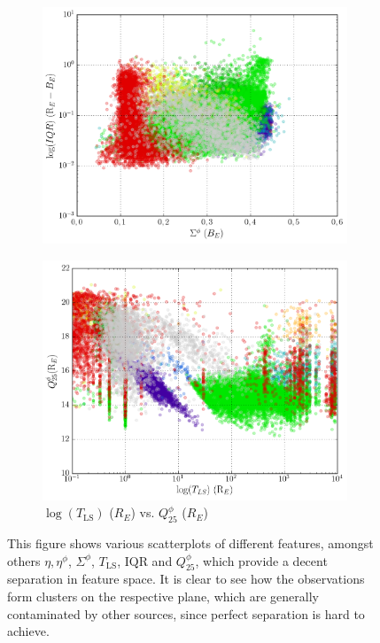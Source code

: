 \begin{figure}[H]
\begin{subfigure}[t]{0.49\textwidth}
		\label{fig:2e}
		\includegraphics[width=\textwidth]{figures/scatterplots/B-phase-cs-R-B-IQR.png}
	\end{subfigure}
	\begin{subfigure}[t]{0.49\textwidth}
		\centering
		\caption{$\log(T_{\text{LS}})$ ($R_E$) vs. $Q_{25}^\phi$ ($R_E$)}
		\label{fig:2f}
		\includegraphics[width=\textwidth]{figures/scatterplots/R-ls-period-R-phase-q25.png}
	\end{subfigure}
	\caption[Scatterplots for different features.]{This figure shows various scatterplots of different features, amongst others $\eta, \eta^\phi$, $\Sigma^\phi$, $T_\text{LS}$, $\text{IQR}$ and $Q_{25}^\phi$, which provide a decent separation in feature space. It is clear to see how the observations form clusters on the respective plane, which are generally contaminated by other sources, since perfect separation is hard to achieve.\\}
	\label{fig:features-scatterplot}
\end{figure}

